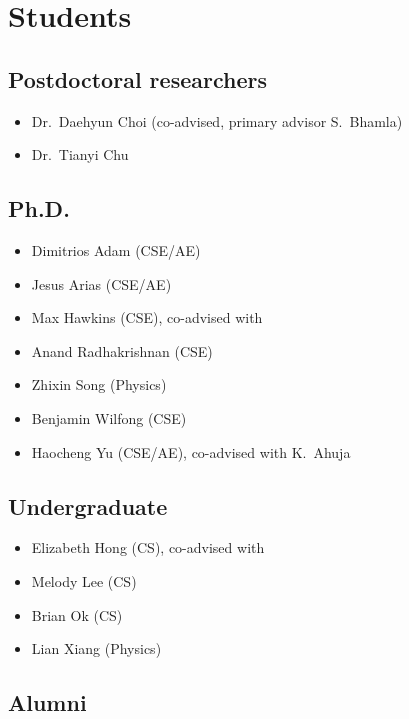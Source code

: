\section{Students}

\subsection{Postdoctoral researchers}

\begin{itemize}
    \item Dr.\ Daehyun Choi (co-advised, primary advisor S.\ Bhamla)
    \item Dr.\ Tianyi Chu
\end{itemize}

\subsection{Ph.D.}

\begin{itemize}
    \item Dimitrios Adam (CSE/AE)
    \item Jesus Arias (CSE/AE)
    \item Max Hawkins (CSE), co-advised with \Rich
    \item Anand Radhakrishnan (CSE)
    \item Zhixin Song (Physics)
    \item Benjamin Wilfong (CSE)
    \item Haocheng Yu (CSE/AE), co-advised with K.\ Ahuja
\end{itemize}

\subsection{Undergraduate}

\begin{itemize}

    \item Elizabeth Hong (CS), co-advised with \Rich
    \item Melody Lee (CS)
    \item Brian Ok (CS)
    \item Lian Xiang (Physics)
\end{itemize}

\subsection{Alumni}

